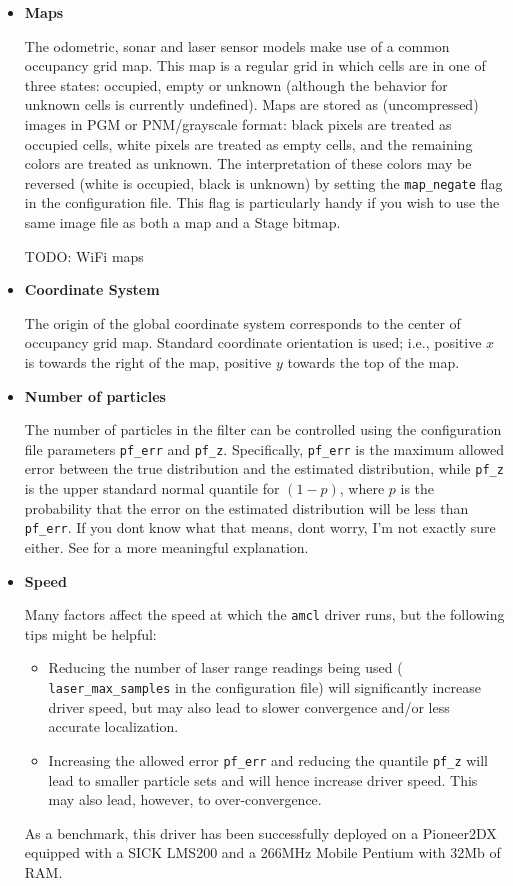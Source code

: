 \begin{itemize}

\item {\bf Maps} 

The odometric, sonar and laser sensor models make use of a common
occupancy grid map.  This map is a regular grid in which cells are in
one of three states: occupied, empty or unknown (although the behavior
for unknown cells is currently undefined).  Maps are stored as
(uncompressed) images in PGM or PNM/grayscale format: black pixels are
treated as occupied cells, white pixels are treated as empty cells,
and the remaining colors are treated as unknown.  The interpretation
of these colors may be reversed (white is occupied, black is unknown)
by setting the {\tt map\_negate} flag in the configuration file.  This
flag is particularly handy if you wish to use the same image file as
both a map and a Stage bitmap.

TODO: WiFi maps

\item {\bf Coordinate System}

The origin of the global coordinate system corresponds to the center
of occupancy grid map.  Standard coordinate orientation is used; i.e.,
positive $x$ is towards the right of the map, positive $y$ towards the
top of the map.

\item {\bf Number of particles} 

The number of particles in the filter can be controlled using the
configuration file parameters {\tt pf\_err} and {\tt pf\_z}.
Specifically, {\tt pf\_err} is the maximum allowed error between the
true distribution and the estimated distribution, while {\tt pf\_z} is
the upper standard normal quantile for $(1 - p)$, where $p$ is the
probability that the error on the estimated distribution will be less
than {\tt pf\_err}.  If you dont know what that means, dont worry, I'm
not exactly sure either.  See \cite{fox01a} for a more meaningful
explanation.

\item {\bf Speed}

Many factors affect the speed at which the {\tt amcl} driver
runs, but the following tips might be helpful:
  \begin{itemize} 
  \item Reducing the number of laser range readings being used ({\tt
  laser\_max\_samples} in the configuration file) will significantly
  increase driver speed, but may also lead to slower convergence
  and/or less accurate localization.
  \item Increasing the allowed error {\tt pf\_err} and reducing the
  quantile {\tt pf\_z} will lead to smaller particle sets and will
  hence increase driver speed.  This may also lead, however, to
  over-convergence.
  \end{itemize}
As a benchmark, this driver has been successfully deployed on a
Pioneer2DX equipped with a SICK LMS200 and a 266MHz Mobile Pentium
with 32Mb of RAM.


\end{itemize}
